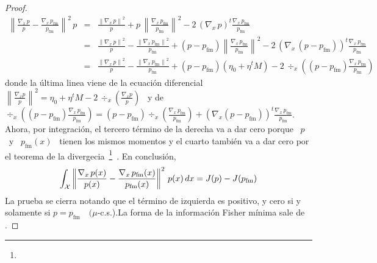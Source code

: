 \begin{proof}
  \begin{eqnarray*}
  \left\| \frac{\nabla_x \, p}{p} - \frac{\nabla_x
  \, p_{\mathrm{fm}}}{p_{\mathrm{fm}}} \right\|^2 \, p
  & = & \frac{\left\| \nabla_x \, p \right\|^2}{p} +
  p \, \left\| \frac{\nabla_x \, p_{\mathrm{fm}}}{p_{\mathrm{fm}}} \right\|^2 -
  2 \, \left( \nabla_x \, p \right)^t \frac{\nabla_x \,
  p_{\mathrm{fm}}}{p_{\mathrm{fm}}} \\[2.5mm]
  & = & \frac{\left\| \nabla_x \, p \right\|^2}{p} - \frac{\left\| \nabla_x \,
  p_{\mathrm{fm}} \right\|^2}{p_{\mathrm{fm}}} + \left( p -
  p_{\mathrm{fm}} \right) \left\| \frac{\nabla_x \,
  p_{\mathrm{fm}}}{p_{\mathrm{fm}}}  \right\|^2 - 2 \, \left( \nabla_x \, \left( p -
  p_{\mathrm{fm}} \right) \right)^t \frac{\nabla_x \, p_{\mathrm{fm}}}{p_{\mathrm{fm}}}\\[2.5mm]
  & = & \frac{\left\| \nabla_x \, p \right\|^2}{p} - \frac{\left\| \nabla_x \,
  p_{\mathrm{fm}} \right\|^2}{p_{\mathrm{fm}}} + \left( p -
  p_{\mathrm{fm}} \right) \left( \eta_0 + \eta^t M \right) - 2 \, \div_x\left( \left(
  p        -       p_{\mathrm{fm}}        \right)       \frac{\nabla_x        \,
  p_{\mathrm{fm}}}{p_{\mathrm{fm}}}      \right)
  \end{eqnarray*}
  donde   la   \'ultima   linea   viene   de   la   ecuaci\'on   diferencial   \
  $\left\|   \frac{\nabla_x   p}{p}  \right\|^2   =   \eta_0   +  \eta^t   M   -
  2 \, \div_x \left( \frac{\nabla_x p}{p} \right)$ \ y de \ $\div_x\left( \left(
  p        -       p_{\mathrm{fm}}        \right)       \frac{\nabla_x        \,
  p_{\mathrm{fm}}}{p_{\mathrm{fm}}}      \right)      =     \left(      p      -
  p_{\mathrm{fm}}       \right)       \div_x\left(       \frac{\nabla_x       \,
  p_{\mathrm{fm}}}{p_{\mathrm{fm}}}  \right)  +  \left(   \nabla_x  \left(  p  -
  p_{\mathrm{fm}}        \right)     \right)^t            \frac{\nabla_x             \,
  p_{\mathrm{fm}}}{p_{\mathrm{fm}}}$.
  Ahora, por integraci\'on, el tercero t\'ermino de la derecha va a dar cero 
  porque \ $p$ \ y \ $p_{\mathrm{fm}}(x)$ \ tienen los mismos momentos y el cuarto tambi\'en va a dar cero por el teorema de la divergecia~\footnote{}~\cite{toto}. En conclusi\'on,
  \[
  \int_{\mathcal{X}} \left\| \frac{\nabla_x \, p(x)}{p(x)} - \frac{\nabla_x
  \, p_{\mathrm{fm}}(x)}{p_{\mathrm{fm}}(x)} \right\|^2 \, p(x) \, dx = J(p) - J(p_{\mathrm{fm}})
  \]
  La  prueba se cierra notando que
  el  t\'ermino de  izquierda es  positivo,  y cero  si  y solamente  si $p  =
  p_{\mathrm{fm}} \quad (\mu$-c.s.).\newline La forma de la informaci\'on Fisher
  m\'inima sale de \SZ{finir}.
\end{proof}



